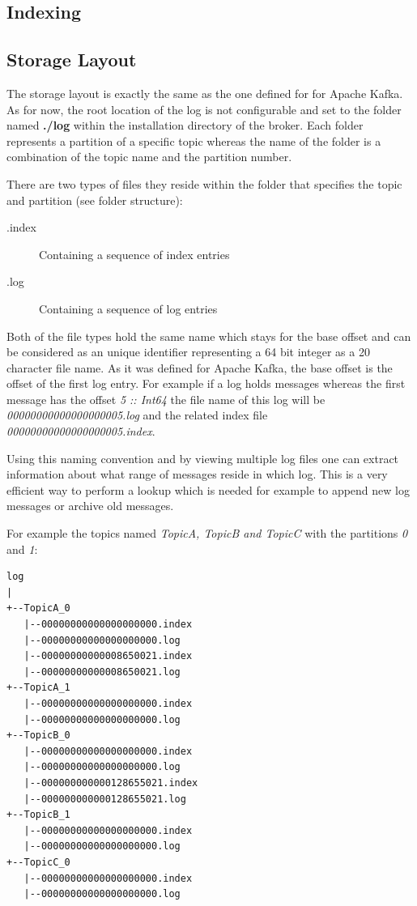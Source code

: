 \subsection{Indexing}

\subsection{Storage Layout}
The storage layout is exactly the same as the one defined for for Apache Kafka.
 As for now, the root location of the log is not configurable and
set to the folder named \textbf{./log} within the installation directory of the
broker. Each folder represents a partition of a specific topic whereas the name
of the folder is a combination of the topic name and the partition number. 

There are two types of files they reside within the folder that specifies the
topic and partition (see folder structure):

\begin{description}
    \item[.index] Containing a sequence of index entries
    \item[.log] Containing a sequence of log entries
\end{description}

Both of the file types hold the same name which stays for the base offset and
can be considered as an unique identifier representing a 64 bit integer as a 20
character file name. As it was defined for Apache Kafka, the base offset is the
offset of the first log entry. For example if a log holds messages whereas the
first message has the offset \textit{5 :: Int64} the file name of this log will
be \textit{00000000000000000005.log} and the related index file
\textit{00000000000000000005.index}.

Using this naming convention and by
viewing multiple log files one can extract information about what range of
messages reside in which log. This is a very efficient way to perform a lookup
which is needed for example to append new log messages or archive old messages.

For example the topics named \textit{TopicA, TopicB and TopicC} with the partitions \textit{0} and
\textit{1}:
\begin{verbatim}
log
|
+--TopicA_0
   |--00000000000000000000.index
   |--00000000000000000000.log
   |--00000000000008650021.index
   |--00000000000008650021.log
+--TopicA_1
   |--00000000000000000000.index
   |--00000000000000000000.log
+--TopicB_0
   |--00000000000000000000.index
   |--00000000000000000000.log
   |--000000000000128655021.index
   |--000000000000128655021.log
+--TopicB_1
   |--00000000000000000000.index
   |--00000000000000000000.log
+--TopicC_0
   |--00000000000000000000.index
   |--00000000000000000000.log
\end{verbatim}
\label{broker-storage}


